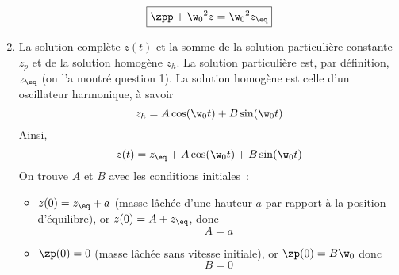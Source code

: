 \documentclass[a4paper, 12pt, final, garamond]{book}
\begin{document}
\begin{enumerate}
        \[\boxed{\zpp + \w_0{}^2z = \w_0{}^2z_{\eq}}\]
    \item La solution complète $z(t)$ et la somme de la solution particulière
        constante $z_p$ et de la solution homogène $z_h$. La solution
        particulière est, par définition, $z_{\eq}$ (on l'a montré question 1).
        La solution homogène est celle d'un oscillateur harmonique, à savoir
        \[z_h = A\cos(\w_0t) + B\sin(\w_0t)\]
        Ainsi,
        \[z(t) = z_{\eq} + A\cos(\w_0t) + B\sin(\w_0t)\]
        On trouve $A$ et $B$ avec les conditions initiales~:
        \begin{itemize}
            \item $z(0) = z_{\eq} + a$ (masse lâchée d'une hauteur $a$ par
                rapport à la position d'équilibre), or $z(0) = A + z_{\eq}$,
                donc
                \[A = a\]
            \item $\zp(0) = 0$ (masse lâchée sans vitesse initiale), or $\zp(0)
                = B\w_0$ donc
                \[B = 0\]
        \end{itemize}
\end{enumerate}
\end{document}
